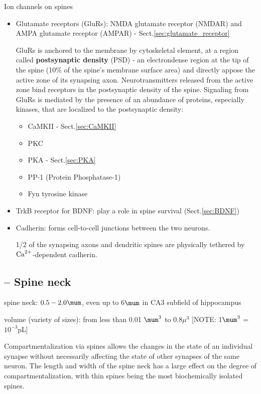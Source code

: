 Ion channels on spines
\begin{itemize}
  \item Glutamate receptors (GluRs): NMDA glutamate receptor
  (NMDAR) and AMPA glutamate receptor (AMPAR) - Sect.\ref{sec:glutamate_receptor}
  
GluRs is anchored to the membrane by cytoskeletal element, at a region called
{\bf postsynaptic density} (PSD) - an electrondense region at the tip of the
spine (10\% of the spine's membrane surface area) and directly appose the active
zone of its synapsing axon. Neurotransmitters released from the active zone bind
receptors in the postsynaptic density of the spine.
Signaling from GluRs is mediated by the presence of an abundance of proteins,
especially kinases, that are localized to the postsynaptic density:
\begin{itemize}
  \item CaMKII - Sect.\ref{sec:CaMKII}
  \item PKC 
  \item PKA - Sect.\ref{sec:PKA}
  \item PP-1 (Protein Phosphatase-1)
  \item Fyn tyrosine kinase
\end{itemize}
 
  \item TrkB receptor for BDNF: play a role in spine survival
  (Sect.\ref{sec:BDNF})
  
  \item Cadherin: forms cell-to-cell junctions between the two neurons.
  
1/2 of the synapsing axons and dendritic spines are physically tethered by
${\text{Ca}^{2+}}$-dependent cadherin.
\end{itemize}
   
\subsection{-- Spine neck}
\label{sec:spine-neck}

spine neck: $0.5-2.0\mum$, even up to 6$\mum$ in CA3 subfield of
  hippocampus
   
volume (variety of sizes): from less than 0.01 $\mum^3$ to
   0.8$\mu^3$ [NOTE: 1$\mum^3$ = $10^{-3}$pL]
   

Compartmentalization via spines allows the changes in the state of an individual
synapse without necessarily affecting the state of other synapses of the same neuron.
The length and width of the spine neck has a large effect on the degree of
compartmentalization, with thin spines being the most biochemically isolated spines.

